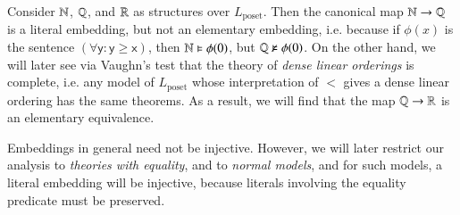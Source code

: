\begin{example}
    Consider $\operatorname{\mathbb{N}}$, $\operatorname{\mathbb{Q}}$, and $\operatorname{\mathbb{R}}$ as structures over $L_{\text{poset}}$. Then the canonical map $\operatorname{\mathbb{N}} \to \operatorname{\mathbb{Q}}$ is a literal embedding, but not an elementary embedding, i.e. because if $\phi(x)$ is the sentence $\mathsf{(\forall y: y \geq x)}$, then $\operatorname{\mathbb{N}} \vDash \phi(0)$, but $\operatorname{\mathbb{Q}} \not \vDash \phi(0)$. On the other hand, we will later see via Vaughn's test that the theory of \emph{dense linear orderings} is complete, i.e. any model of $L_{\text{poset}}$ whose interpretation of $<$ gives a dense linear ordering has the same theorems. As a result, we will find that the map $\operatorname{\mathbb{Q}} \to \operatorname{\mathbb{R}}$ is an elementary equivalence.
\end{example}

\begin{remark}
    Embeddings in general need not be injective. However, we will later restrict our analysis to \emph{theories with equality}, and to \emph{normal models}, and for such models, a literal embedding will be injective, because literals involving the equality predicate must be preserved.
\end{remark}

